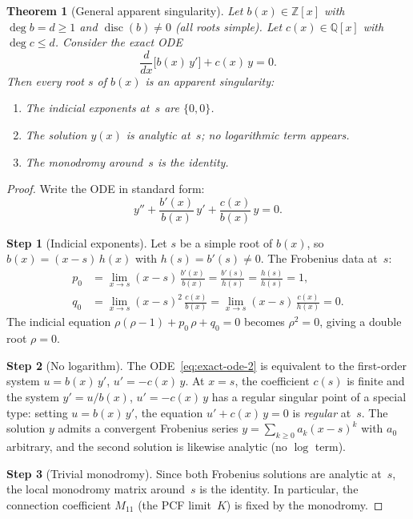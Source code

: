 \documentclass[11pt,a4paper]{amsart}
\theoremstyle{plain}
\newtheorem{theorem}{Theorem}[section]
\theoremstyle{definition}
\theoremstyle{remark}
\newcommand{\Z}{\mathbb{Z}}
\newcommand{\Q}{\mathbb{Q}}
\newcommand{\disc}{\operatorname{disc}}
\begin{document}
\begin{theorem}[General apparent singularity]\label{thm:apparent}
Let $b(x)\in\Z[x]$ with $\deg b = d \ge 1$ and $\disc(b)\ne 0$
(all roots simple).  Let $c(x)\in\Q[x]$ with $\deg c \le d$.
Consider the exact ODE
\begin{equation}\label{eq:exact-ode-2}
  \frac{d}{dx}\bigl[b(x)\,y'\bigr] + c(x)\,y = 0.
\end{equation}
Then every root $s$ of $b(x)$ is an \emph{apparent singularity}:
\begin{enumerate}[label=(\roman*)]
\item The indicial exponents at~$s$ are $\{0,0\}$.
\item The solution $y(x)$ is analytic at~$s$; no logarithmic
  term appears.
\item The monodromy around~$s$ is the identity.
\end{enumerate}
\end{theorem}

\begin{proof}
Write the ODE in standard form:
\[
  y'' + \frac{b'(x)}{b(x)}\,y' + \frac{c(x)}{b(x)}\,y = 0.
\]

\textbf{Step 1} (Indicial exponents).
Let $s$ be a simple root of $b(x)$, so $b(x) = (x-s)\,h(x)$ with
$h(s) = b'(s) \ne 0$.  The Frobenius data at~$s$:
\begin{align*}
  p_0 &= \lim_{x\to s}(x-s)\,\frac{b'(x)}{b(x)}
       = \frac{b'(s)}{h(s)} = \frac{h(s)}{h(s)} = 1, \\
  q_0 &= \lim_{x\to s}(x-s)^2\,\frac{c(x)}{b(x)}
       = \lim_{x\to s}(x-s)\,\frac{c(x)}{h(x)} = 0.
\end{align*}
The indicial equation $\rho(\rho-1) + p_0\,\rho + q_0 = 0$
becomes $\rho^2 = 0$, giving a double root $\rho = 0$.

\textbf{Step 2} (No logarithm).
The ODE~\eqref{eq:exact-ode-2} is equivalent to the first-order
system $u = b(x)\,y'$, $u' = -c(x)\,y$.  At $x=s$, the coefficient
$c(s)$ is finite and the system $y' = u/b(x)$, $u' = -c(x)\,y$
has a regular singular point of a special type: setting $u = b(x)\,y'$,
the equation $u' + c(x)\,y = 0$ is \emph{regular} at~$s$.
The solution $y$ admits a convergent Frobenius series
$y = \sum_{k\ge 0} a_k(x-s)^k$ with $a_0$ arbitrary, and the
second solution is likewise analytic (no $\log$ term).

\textbf{Step 3} (Trivial monodromy).
Since both Frobenius solutions are analytic at~$s$, the local
monodromy matrix around~$s$ is the identity.  In particular,
the connection coefficient $M_{11}$ (the PCF limit~$K$) is fixed
by the monodromy.
\end{proof}
\end{document}
